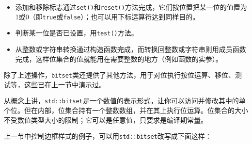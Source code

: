 
\begin{itemize}
\item 添加和移除标志通过\texttt{set()}和\texttt{reset()}方法完成，它们按位置把某一位的值置为1或0（即\texttt{true}或\texttt{false}）；也可以用下标运算符达到同样目的。



\item 判断某一位是否已设置，用\texttt{test()}方法。



\item 从整数或字符串转换通过构造函数完成，而转换回整数或字符串则用成员函数完成，这样位集合的值就能用在需要整数的地方（例如函数的实参）。

\end{itemize}



除了上述操作，\texttt{bitset}类还提供了其他方法，用于对位执行按位运算、移位、测试等，这些已在上一节中演示过。



从概念上讲，\texttt{std::\allowbreak{}bitset}是一个数值的表示形式，让你可以访问并修改其中的单个位。但在内部，位集合持有一个整数数组，并在其上执行位运算。位集合的大小不受数值类型大小的限制；它可以是任意值，只要求是编译期常量。



上一节中控制边框样式的例子，可以用\texttt{std::\allowbreak{}bitset}改写成下面这样：



